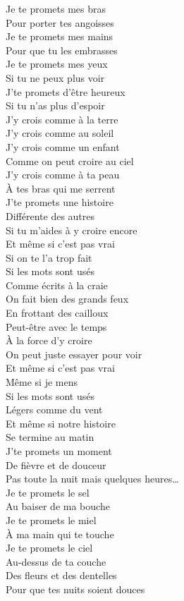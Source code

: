 \documentclass{novel}
\begin{document}
\begin{multicols}{2}
Je te promets mes bras \\
Pour porter tes angoisses \\
Je te promets mes mains \\
Pour que tu les embrasses \\
Je te promets mes yeux \\
Si tu ne peux plus voir \\
J'te promets d'être heureux \\
Si tu n'as plus d'espoir \\

J'y crois comme à la terre \\
J'y crois comme au soleil \\
J'y crois comme un enfant \\
Comme on peut croire au ciel \\
J'y crois comme à ta peau \\
À tes bras qui me serrent \\
J'te promets une histoire \\
Différente des autres \\
Si tu m'aides à y croire encore \\

Et même si c'est pas vrai \\
Si on te l'a trop fait \\
Si les mots sont usés \\
Comme écrits à la craie \\
On fait bien des grands feux \\
En frottant des cailloux \\
Peut-être avec le temps \\
À la force d'y croire \\
On peut juste essayer pour voir \\

Et même si c'est pas vrai \\
Même si je mens \\
Si les mots sont usés \\
Légers comme du vent \\
Et même si notre histoire \\
Se termine au matin \\
J'te promets un moment \\
De fièvre et de douceur \\
Pas toute la nuit mais quelques heures… \\

Je te promets le sel \\
Au baiser de ma bouche \\
Je te promets le miel \\
À ma main qui te touche \\
Je te promets le ciel \\
Au-dessus de ta couche \\
Des fleurs et des dentelles \\
Pour que tes nuits soient douces
\end{multicols}
\end{document}
